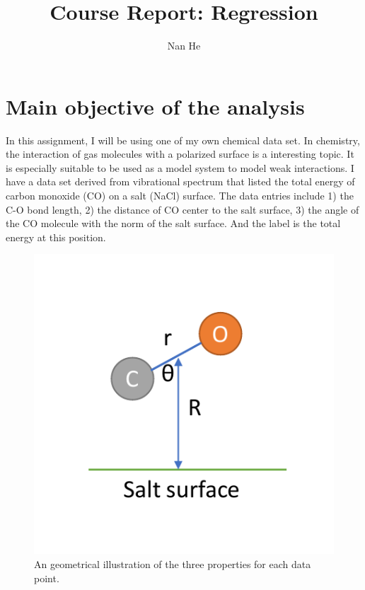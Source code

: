 \documentclass[11pt]{article}
\title{Course Report: Regression}
\author{Nan He}
\date{}
\begin{document}
\maketitle


\section{Main objective of the analysis}\label{section-introduction-1}
In this assignment, I will be using one of my own chemical data set.
In chemistry, the interaction of gas molecules with a polarized surface is a interesting topic.
It is especially suitable to be used as a model system to model weak interactions.
I have a data set derived from vibrational spectrum that listed the total energy of carbon monoxide (CO) on a salt (NaCl) surface.
The data entries include 1) the C-O bond length, 2) the distance of CO center to the salt surface, 3) the angle of the CO molecule with the norm of the salt surface. And the label is the total energy at this position.

\begin{figure}[h]
\centerline{\includegraphics[scale=0.8]{fig1.pdf}}
\caption{An geometrical illustration of the three properties for each data point.}
\end{figure}
\end{document}
